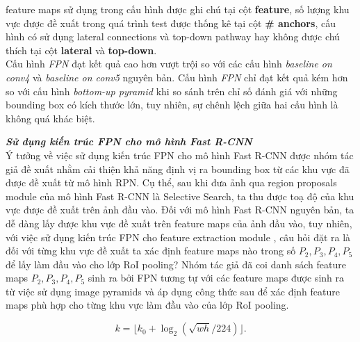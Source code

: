 {    feature maps  sử dụng trong cấu hình được ghi chú tại cột \textbf{feature}, số lượng khu vực được đề xuất trong quá trình test được thống kê tại cột \textbf{\# anchors}, cấu hình có sử dụng lateral connections  và top-down pathway hay không được chú thích tại cột \textbf{lateral} và \textbf{top-down}. \\
    Cấu hình \textit{FPN} đạt kết quả cao hơn vượt trội so với các cấu hình \textit{baseline on conv4} và \textit{baseline on conv5} nguyên bản.
    Cấu hình \textit{FPN} chỉ đạt kết quả kém hơn so với cấu hình \textit{bottom-up pyramid} khi so sánh trên chỉ số đánh giá với những bounding box  có kích thước lớn, tuy nhiên, sự chênh lệch giữa hai cấu hình là không quá khác biệt.

    \noindent
    \textbf{\textit{Sử dụng kiến trúc FPN cho mô hình Fast R-CNN }} \\
    Ý tưởng về việc sử dụng kiến trúc FPN cho mô hình Fast R-CNN  được nhóm tác giả đề xuất nhằm cải thiện khả năng định vị ra bounding box  từ các khu vực đã được đề xuất từ mô hình RPN.
    Cụ thể, sau khi đưa ảnh qua region proposals module  của mô hình Fast R-CNN  là Selective Search, ta thu được toạ độ của khu vực được đề xuất trên ảnh đầu vào.
    Đối với mô hình Fast R-CNN  nguyên bản, ta dễ dàng lấy được khu vực đề xuất trên feature maps  của ảnh đầu vào, tuy nhiên, với việc sử dụng kiến trúc FPN cho feature extraction module , câu hỏi đặt ra là đối với từng khu vực đề xuất ta xác định feature maps  nào trong số \textit{{${P}_{2}, {P}_{3}, {P}_{4}, {P}_{5}$}} để lấy làm đầu vào cho lớp RoI pooling?
    Nhóm tác giả đã coi danh sách feature maps  \textit{{${P}_{2}, {P}_{3}, {P}_{4}, {P}_{5}$}} sinh ra bởi FPN tương tự với các feature maps  được sinh ra từ việc sử dụng image pyramids và áp dụng công thức sau để xác định feature maps  phù hợp cho từng khu vực làm đầu vào của lớp RoI pooling.

    \begin{equation}
        \label{eq:roi_mapping}
        k = \lfloor k_0 + \log_2(\sqrt{wh} / 224) \rfloor.
    \end{equation}

}
